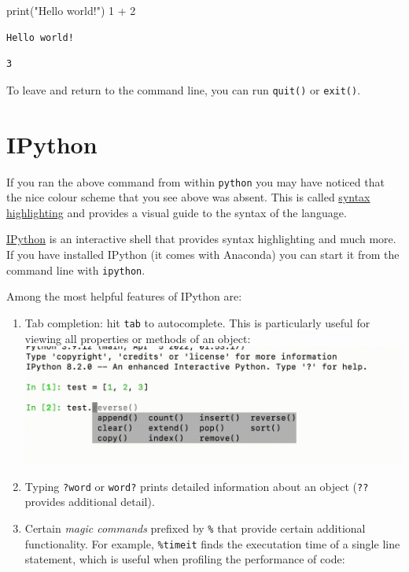\documentclass[
  letterpaper,
  DIV=11,
  numbers=noendperiod]{scrreprt}
\newenvironment{Shaded}{\begin{snugshade}}{\end{snugshade}}
\newcommand{\BuiltInTok}[1]{\textcolor[rgb]{0.00,0.23,0.31}{#1}}
\newcommand{\DecValTok}[1]{\textcolor[rgb]{0.68,0.00,0.00}{#1}}
\newcommand{\NormalTok}[1]{\textcolor[rgb]{0.00,0.23,0.31}{#1}}
\newcommand{\OperatorTok}[1]{\textcolor[rgb]{0.37,0.37,0.37}{#1}}
\newcommand{\StringTok}[1]{\textcolor[rgb]{0.13,0.47,0.30}{#1}}
\providecommand{\tightlist}{%
  \setlength{\itemsep}{0pt}\setlength{\parskip}{0pt}}\usepackage{longtable,booktabs,array}
\theoremstyle{definition}
\theoremstyle{remark}
\begin{document}
\begin{Shaded}
\begin{Highlighting}[]
\BuiltInTok{print}\NormalTok{(}\StringTok{"Hello world!"}\NormalTok{)}
\DecValTok{1} \OperatorTok{+} \DecValTok{2}
\end{Highlighting}
\end{Shaded}

\begin{verbatim}
Hello world!
\end{verbatim}

\begin{verbatim}
3
\end{verbatim}

To leave and return to the command line, you can run \texttt{quit()} or
\texttt{exit()}.

\hypertarget{ipython}{%
\section{IPython}\label{ipython}}

If you ran the above command from within \texttt{python} you may have
noticed that the nice colour scheme that you see above was absent. This
is called
\href{https://en.wikipedia.org/wiki/Syntax_highlighting}{syntax
highlighting} and provides a visual guide to the syntax of the language.

\href{https://ipython.readthedocs.io/en/stable/}{IPython} is an
interactive shell that provides syntax highlighting and much more. If
you have installed IPython (it comes with Anaconda) you can start it
from the command line with \texttt{ipython}.

Among the most helpful features of IPython are:

\begin{enumerate}
\def\labelenumi{\arabic{enumi}.}
\tightlist
\item
  Tab completion: hit \texttt{tab} to autocomplete. This is particularly
  useful for viewing all properties or methods of an object:
  \includegraphics{./assets/tab-complete.png}
\item
  Typing \texttt{?word} or \texttt{word?} prints detailed information
  about an object (\texttt{??} provides additional detail).
\item
  Certain \emph{magic commands} prefixed by \texttt{\%} that provide
  certain additional functionality. For example, \texttt{\%timeit} finds
  the executation time of a single line statement, which is useful when
  profiling the performance of code:
\end{enumerate}
\end{document}

